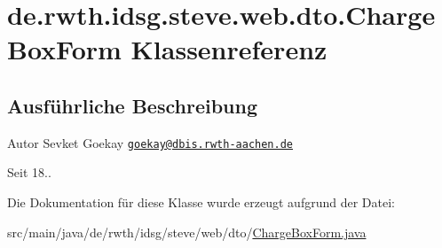 \hypertarget{classde_1_1rwth_1_1idsg_1_1steve_1_1web_1_1dto_1_1_charge_box_form}{\section{de.\-rwth.\-idsg.\-steve.\-web.\-dto.\-Charge\-Box\-Form Klassenreferenz}
\label{classde_1_1rwth_1_1idsg_1_1steve_1_1web_1_1dto_1_1_charge_box_form}
}


\subsection{Ausführliche Beschreibung}
\begin{DoxyAuthor}{Autor}
Sevket Goekay \href{mailto:goekay@dbis.rwth-aachen.de}{\tt goekay@dbis.\-rwth-\/aachen.\-de} 
\end{DoxyAuthor}
\begin{DoxySince}{Seit}
18.. 
\end{DoxySince}


Die Dokumentation für diese Klasse wurde erzeugt aufgrund der Datei\-:\begin{DoxyCompactItemize}
\item 
src/main/java/de/rwth/idsg/steve/web/dto/\hyperlink{_charge_box_form_8java}{Charge\-Box\-Form.\-java}\end{DoxyCompactItemize}
